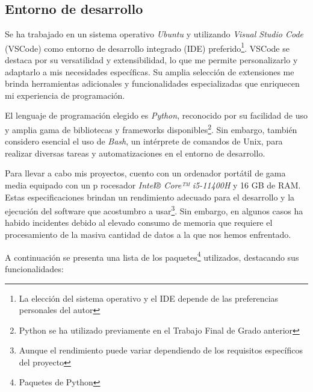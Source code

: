 
\subsection{Entorno de desarrollo}

Se ha trabajado en un sistema operativo \textit{Ubuntu} y utilizando \textit{Visual Studio Code} 
(VSCode) como entorno de desarrollo integrado (IDE) preferido\footnote{ La elección del sistema 
operativo y el IDE depende de las preferencias personales del autor}. VSCode se destaca por 
su versatilidad y extensibilidad, lo que me permite personalizarlo y adaptarlo a mis necesidades 
específicas. Su amplia selección de extensiones me brinda herramientas adicionales y funcionalidades 
especializadas que enriquecen mi experiencia de programación.

El lenguaje de programación elegido es \textit{Python}, reconocido por su facilidad de uso y amplia 
gama de bibliotecas y frameworks disponibles\footnote{ Python se ha utilizado previamente en el 
Trabajo Final de Grado anterior}. Sin embargo, también considero esencial el uso de \textit{Bash}, 
un intérprete de comandos de Unix, para realizar diversas tareas y automatizaciones en el entorno 
de desarrollo.

Para llevar a cabo mis proyectos, cuento con un ordenador portátil de gama media equipado con un p
rocesador \textit{Intel® Core™ i5-11400H} y 16 GB de RAM. Estas especificaciones brindan un rendimiento 
adecuado para el desarrollo y la ejecución del software que acostumbro a usar\footnote{ Aunque el 
rendimiento puede variar dependiendo de los requisitos específicos del proyecto}. Sin embargo, en 
algunos casos ha habido incidentes debido al elevado consumo de memoria que requiere el procesamiento 
de la masiva cantidad de datos a la que nos hemos enfrentado.

A continuación se presenta una lista de los paquetes\footnote{Paquetes de Python} utilizados, destacando sus funcionalidades:

